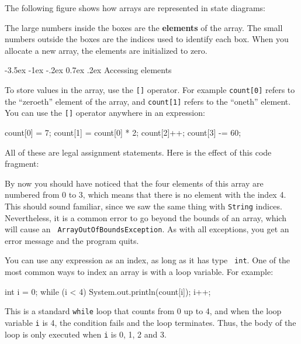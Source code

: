 \documentclass{book}
\makeatletter
\renewcommand{\section}{\@startsection 
    {section} {1} {0mm}%
    {-3.5ex \@plus -1ex \@minus -.2ex}%
    {0.7ex \@plus.2ex}%
    {\normalfont\Large\bfseries}}
\makeatother
\begin{document}

The following figure shows how arrays are represented in state
diagrams:




The large numbers inside the boxes are the {\bf elements} of
the array.  The small numbers outside the boxes are the
indices used to identify each box.  When you allocate a new
array, the elements are initialized to zero.

\section{Accessing elements}

To store values in the array, use the
{\tt []} operator.  For example {\tt count[0]} refers to the
``zeroeth'' element of the array, and {\tt count[1]} refers to the
``oneth'' element.  You can use the {\tt []} operator anywhere in an
expression:

\begin{verbatimtab}
    count[0] = 7;
    count[1] = count[0] * 2;
    count[2]++;
    count[3] -= 60;
\end{verbatimtab}
%
All of these are legal assignment statements.  Here is the
effect of this code fragment:




By now you should have noticed that the four elements of this array
are numbered from 0 to 3, which means that there is no element with
the index 4.  This should sound familiar, since we saw the same thing
with {\tt String} indices.  Nevertheless, it is a common error to go
beyond the bounds of an array, which will cause an {\tt
ArrayOutOfBoundsException}.  As with all exceptions, you get an error
message and the program quits.


You can use any expression as an index, as long as it has type {\tt
int}.  One of the most common ways to index an array is with a loop
variable.  For example:

\begin{verbatimtab}
    int i = 0;
    while (i < 4) {
      System.out.println(count[i]);
      i++;
    }
\end{verbatimtab}
%
This is a standard {\tt while} loop that counts from 0
up to 4, and when the loop variable {\tt i} is 4, the
condition fails and the loop terminates.  Thus, the body
of the loop is only executed when {\tt i} is 0, 1, 2 and 3.
\end{document}

